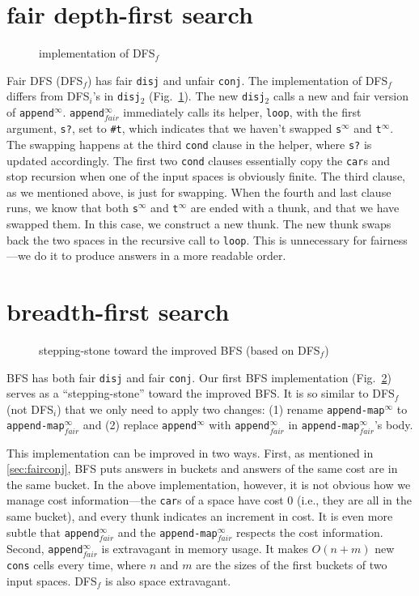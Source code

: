 \documentclass[format=acmlarge, review=true, authordraft=true]{acmart}
\newcommand{\conj}{\texttt{conj}}
\newcommand{\disj}{\texttt{disj}}
\newcommand{\disjtwo}{\texttt{disj$_2$}}
\newcommand{\appendInf}{\texttt{append$^\infty$}}
\newcommand{\appendInfFair}{\texttt{append$^\infty_{fair}$}}
\newcommand{\appendMapInf}{\texttt{append-map$^\infty$}}
\newcommand{\appendMapInfFair}{\texttt{append-map$^\infty_{fair}$}}
\newcommand{\sInf}{\texttt{s$^\infty$}}
\newcommand{\tInf}{\texttt{t$^\infty$}}
\newcommand{\DFSi }[0]{DFS$_{i}$}
\newcommand{\DFSf }[0]{DFS$_{f}$}
\newcommand{\BFS}[0]{BFS}
\newcommand{\BFSimp}[0]{the improved BFS}
\begin{document}
\section{fair depth-first search}

\begin{figure}
	
	\caption{implementation of \DFSf{}}
	\label{fDFS}
\end{figure}

Fair DFS (\DFSf) has fair \disj{} and unfair \conj{}. The 
implementation of \DFSf{} differs from \DFSi{}'s in 
\disjtwo{} (Fig.~\ref{fDFS}). The new \disjtwo{} calls a new and 
fair version of \appendInf{}. \appendInfFair{} 
immediately 
calls 
its helper, \texttt{loop}, with the first argument, \texttt{s?}, set to 
\texttt{\#{}t}, which indicates that we haven't swapped
\sInf{} and \tInf{}. The swapping 
happens at 
the third \texttt{cond} clause in the helper, where \texttt{s?} is updated 
accordingly. The first two \texttt{cond} clauses essentially copy the 
\texttt{car}s and stop recursion when one of the input spaces is obviously 
finite. The third clause, as we mentioned above, is just for swapping. When the 
fourth and last clause runs, we know that both \sInf{} and 
\tInf{} are ended with a thunk, and that we have swapped them. In 
this case, we construct a new thunk. The new thunk swaps back the two spaces in 
the
recursive call to \texttt{loop}. This is unnecessary for fairness---we do it to 
produce answers in a more readable order.

\section{breadth-first search}

\begin{figure}
		
	\caption{stepping-stone toward \BFSimp{} (based on \DFSf{})}
	\label{BFSuni}
\end{figure}

\BFS{} has both fair \disj{} and fair \conj{}. Our first BFS implementation 
(Fig.~\ref{BFSuni})
serves as a ``stepping-stone'' toward \BFSimp{}. It is so 
similar to \DFSf{} 
(not \DFSi{}) that we only need to apply two changes: (1) rename 
\appendMapInf{} 
to \appendMapInfFair{} and (2) replace \appendInf{} with \appendInfFair{} in 
\appendMapInfFair{}'s body. 

This implementation can be improved in two ways. First, as mentioned in 
\autoref{sec:fairconj}, \BFS{} puts answers in buckets and answers of the same 
cost are in the same bucket. In the above implementation, however, 
it is not obvious how we manage cost information---the \texttt{car}s of a 
space have cost 0 (i.e., they are all in the same bucket), and every 
thunk indicates an increment in cost. It is even more subtle that 
\appendInfFair{} and the \appendMapInfFair{} respects the cost information. 
Second, \appendInfFair{} is extravagant in memory usage. It makes $O(n+m)$ new 
\texttt{cons} cells every time, where $n$ and $m$ are the sizes of 
the first buckets of two input spaces. \DFSf{} is also space extravagant.
\end{document}
